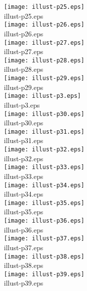 \texttt{[image: illust-p25.eps]}\\illust-p25.eps\\


\texttt{[image: illust-p26.eps]}\\illust-p26.eps\\


\texttt{[image: illust-p27.eps]}\\illust-p27.eps\\


\texttt{[image: illust-p28.eps]}\\illust-p28.eps\\


\texttt{[image: illust-p29.eps]}\\illust-p29.eps\\


\texttt{[image: illust-p3.eps]}\\illust-p3.eps\\


\texttt{[image: illust-p30.eps]}\\illust-p30.eps\\


\texttt{[image: illust-p31.eps]}\\illust-p31.eps\\


\texttt{[image: illust-p32.eps]}\\illust-p32.eps\\


\texttt{[image: illust-p33.eps]}\\illust-p33.eps\\


\texttt{[image: illust-p34.eps]}\\illust-p34.eps\\


\texttt{[image: illust-p35.eps]}\\illust-p35.eps\\


\texttt{[image: illust-p36.eps]}\\illust-p36.eps\\


\texttt{[image: illust-p37.eps]}\\illust-p37.eps\\


\texttt{[image: illust-p38.eps]}\\illust-p38.eps\\


\texttt{[image: illust-p39.eps]}\\illust-p39.eps\\


